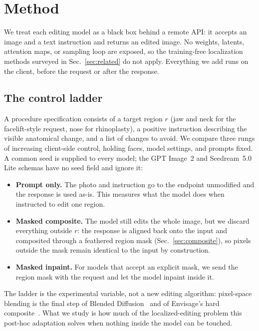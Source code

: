\section{Method}
\label{sec:method}

We treat each editing model as a black box behind a remote API: it accepts an
image and a text instruction and returns an edited image. No weights, latents,
attention maps, or sampling loop are exposed, so the training-free localization
methods surveyed in Sec.~\ref{sec:related} do not apply. Everything we add runs on
the client, before the request or after the response.

\subsection{The control ladder}
\label{sec:ladder}

A procedure specification consists of a target region $r$ (jaw and neck for the
facelift-style request, nose for rhinoplasty), a positive instruction describing
the visible anatomical change, and a list of changes to avoid. We compare three
rungs of increasing client-side control, holding faces, model settings, and
prompts fixed. A common seed is supplied to every model; the GPT Image~2 and
Seedream~5.0 Lite schemas have no seed field and ignore it:

\begin{itemize}
  \item \textbf{Prompt only.} The photo and instruction go to the endpoint
  unmodified and the response is used as-is. This measures what the model does when
  instructed to edit one region.
  \item \textbf{Masked composite.} The model still edits the whole image, but we
  discard everything outside $r$: the response is aligned back onto the input and
  composited through a feathered region mask (Sec.~\ref{sec:composite}), so pixels
  outside the mask remain identical to the input by construction.
  \item \textbf{Masked inpaint.} For models that accept an explicit mask, we send
  the region mask with the request and let the model inpaint inside it.
\end{itemize}

The ladder is the experimental variable, not a new editing algorithm: pixel-space
blending is the final step of Blended Diffusion~\cite{avrahami2022blended} and of
Envisage's hard composite~\cite{agarwal2026envisage}. What we study is how much of
the localized-editing problem this post-hoc adaptation solves when nothing inside
the model can be touched.

